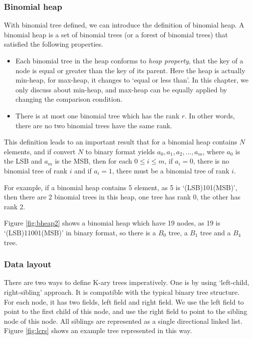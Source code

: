 \documentclass{article}
\begin{document}
\subsubsection{Binomial heap}
\label{Binomial heap} 

With binomial tree defined, we can introduce the definition of binomial heap. A binomial heap is a set of binomial trees (or a forest of binomial trees) that satisfied the following properties.

\begin{itemize}
\item Each binomial tree in the heap conforms to {\em heap property}, that the key of a node is equal or greater than the key of its parent. Here the heap is actually min-heap, for max-heap, it changes to `equal or less than'. In this chapter, we only discuss about min-heap, and max-heap can be equally applied by changing the comparison condition.
\item There is at most one binomial tree which has the rank $r$. In other words, there are no two binomial trees have the same rank.
\end{itemize}

This definition leads to an important result that for a binomial heap contains $N$ elements, and if convert $N$ to binary format yields $a_0, a_1, a_2, ..., a_m$, where $a_0$ is the LSB and $a_m$ is the MSB, then for each $0 \leq i \leq m$, if $a_i=0$, there is no binomial tree of rank $i$ and if $a_i = 1$, there must be a binomial tree of rank $i$.

For example, if a binomial heap contains 5 element, as 5 is `(LSB)101(MSB)', then there are 2 binomial trees in this heap, one tree has rank 0, the other has rank 2.

Figure \ref{fig:bheap2} shows a binomial heap which have 19 nodes, as 19 is `(LSB)11001(MSB)' in binary format, so there is a $B_0$ tree, a $B_1$ tree and a $B_4$ tree.


\subsubsection{Data layout}
There are two ways to define K-ary trees imperatively. One is by using
`left-child, right-sibling' approach\cite{CLRS}. It is compatible with 
the typical binary tree structure. For each node, it has two fields,
left field and right field. We use the left field to point to the first
child of this node, and use the right field to point to the sibling
node of this node. All siblings are represented as a single directional
linked list. Figure \ref{fig:lcrs} shows an example tree represented in this way.
\end{document}
